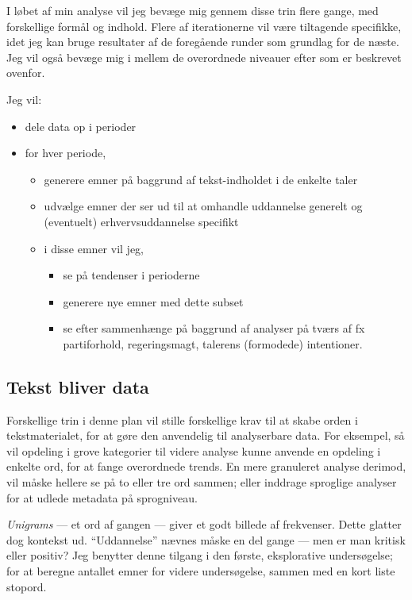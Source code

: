 I løbet af min analyse vil jeg bevæge mig gennem disse trin flere gange, med forskellige formål og indhold.
Flere af iterationerne vil være tiltagende specifikke, idet jeg kan bruge resultater af de foregående runder som grundlag for de næste.
Jeg vil også bevæge mig i mellem de overordnede niveauer efter \autocite{evansMachineTranslationMining2016} som er beskrevet ovenfor.

Jeg vil:

\begin{itemize}


  \item
    dele data op i perioder
  \item
    for hver periode,
    \begin{itemize}
      \item
        generere emner på baggrund af tekst-indholdet i de enkelte taler
      \item
        udvælge emner der ser ud til at omhandle uddannelse generelt og (eventuelt) erhvervsuddannelse specifikt
      \item
        i disse emner vil jeg, 
        \begin{itemize}
          \item
            se på tendenser i perioderne
          \item
            generere nye emner med dette subset
          \item
            se efter sammenhænge på baggrund af analyser på tværs af fx partiforhold, regeringsmagt, talerens (formodede) intentioner.
        \end{itemize}
    \end{itemize}
\end{itemize}

\subsection{Tekst bliver data}

Forskellige trin i denne plan vil stille forskellige krav til at skabe orden i tekstmaterialet, for at gøre den anvendelig til analyserbare data.
For eksempel, så vil opdeling i grove kategorier til videre analyse kunne anvende en opdeling i enkelte ord, for at fange overordnede trends.
En mere granuleret analyse derimod, vil måske hellere se på to eller tre ord sammen; eller inddrage sproglige analyser for at udlede metadata på sprogniveau.

\textit{Unigrams} — et ord af gangen — giver et godt billede af frekvenser.
Dette glatter dog kontekst ud.
“Uddannelse” nævnes måske en del gange — men er man kritisk eller positiv?
Jeg benytter denne tilgang i den første, eksplorative undersøgelse; for at beregne antallet emner for videre undersøgelse, sammen med en kort liste stopord.

